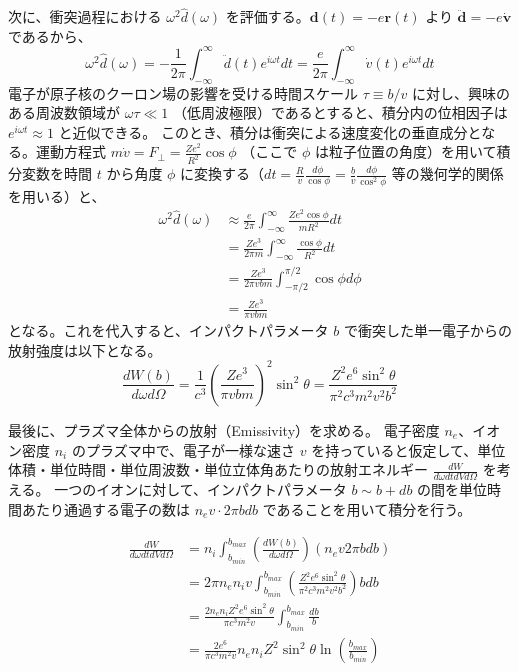 \documentclass[a4paper,11pt]{bxjsarticle} %
\begin{document}
次に、衝突過程における $\omega^2 \hat{d}(\omega)$ を評価する。$\bm{d}(t) = -e \bm{r}(t)$ より $\ddot{\bm{d}} = -e \dot{\bm{v}}$ であるから、
\begin{equation}
    \omega^2 \hat{d}(\omega) = - \frac{1}{2\pi} \int_{-\infty}^{\infty} \ddot{d}(t) e^{i\omega t} dt = \frac{e}{2\pi} \int_{-\infty}^{\infty} \dot{v}(t) e^{i\omega t} dt
\end{equation}
電子が原子核のクーロン場の影響を受ける時間スケール $\tau \equiv b/v$ に対し、興味のある周波数領域が $\omega \tau \ll 1$ （低周波極限）であるとすると、積分内の位相因子は $e^{i\omega t} \approx 1$ と近似できる。
このとき、積分は衝突による速度変化の垂直成分となる。運動方程式 $m \dot{v} = F_{\perp} = \frac{Z e^2}{R^2} \cos\phi$ （ここで $\phi$ は粒子位置の角度）を用いて積分変数を時間 $t$ から角度 $\phi$ に変換する（$dt = \frac{R}{v} \frac{d\phi}{\cos\phi} = \frac{b}{v} \frac{d\phi}{\cos^2\phi}$ 等の幾何学的関係を用いる）と、
\begin{align}
    \omega^2 \hat{d}(\omega) &\approx \frac{e}{2\pi} \int_{-\infty}^{\infty} \frac{Z e^2 \cos\phi}{m R^2} dt \\
    &= \frac{Z e^3}{2\pi m} \int_{-\infty}^{\infty} \frac{\cos\phi}{R^2} dt \\
    &= \frac{Z e^3}{2 \pi v b m} \int_{-\pi/2}^{\pi/2} \cos\phi d\phi \\
    &= \frac{Z e^3}{\pi v b m}
\end{align}
となる。これを代入すると、インパクトパラメータ $b$ で衝突した単一電子からの放射強度は以下となる。
\begin{equation}
    \frac{dW(b)}{d\omega d\Omega} = \frac{1}{c^3} \left( \frac{Z e^3}{\pi v b m} \right)^2 \sin^2\theta = \frac{Z^2 e^6 \sin^2\theta}{\pi^2 c^3 m^2 v^2 b^2}
\end{equation}

最後に、プラズマ全体からの放射（Emissivity）を求める。
電子密度 $n_e$、イオン密度 $n_i$ のプラズマ中で、電子が一様な速さ $v$ を持っていると仮定して、単位体積・単位時間・単位周波数・単位立体角あたりの放射エネルギー $\frac{d W}{d\omega dt dV d\Omega}$ を考える。
一つのイオンに対して、インパクトパラメータ $b \sim b+db$ の間を単位時間あたり通過する電子の数は $n_e v \cdot 2\pi b db$ であることを用いて積分を行う。

\begin{align}
    \frac{d W}{d\omega dt dV d\Omega} &= n_i \int_{b_{min}}^{b_{max}} \left( \frac{dW(b)}{d\omega d\Omega} \right) (n_e v 2\pi b db) \\
    &= 2\pi n_e n_i v \int_{b_{min}}^{b_{max}} \left( \frac{Z^2 e^6 \sin^2\theta}{\pi^2 c^3 m^2 v^2 b^2} \right) b db \\
    &= \frac{2 n_e n_i Z^2 e^6 \sin^2\theta}{\pi c^3 m^2 v} \int_{b_{min}}^{b_{max}} \frac{db}{b} \\
    &= \frac{2 e^6}{\pi c^3 m^2 v} n_e n_i Z^2 \sin^2\theta \ln\left( \frac{b_{max}}{b_{min}} \right)
\end{align}
\end{document}
